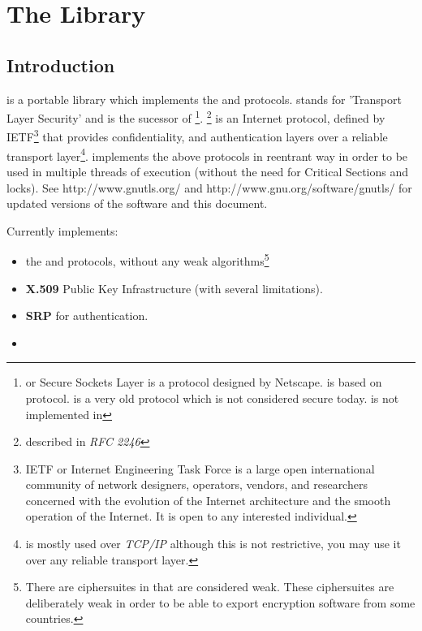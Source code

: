 \documentclass{book}
\begin{document}



\tableofcontents
\newpage
{}
\pagestyle{fancy}

\chapter{The Library}
\section{Introduction}
\par
\gnutls is a portable library which implements the \tlsI and 
\sslIII protocols.
\tls stands for 'Transport Layer Security' and is the sucessor of \ssl\footnote{
\ssl or Secure Sockets Layer is a protocol designed by Netscape. \tlsI is based on
\sslIII protocol. \sslII is a very old protocol which is 
not considered secure today. \sslII is not implemented in \gnutls}.
\tlsI\footnote{described in {\it RFC 2246}} is an Internet protocol,
defined by IETF\footnote{IETF or Internet Engineering Task Force 
is a large open international community of network
designers, operators, vendors, and researchers concerned with the evolution of 
the Internet architecture and the smooth operation of the Internet. It is open to any interested individual.}
that provides confidentiality, and authentication layers over a {reliable
transport layer}\footnote{\tls is mostly used over {\emph{TCP/IP}} although this is not restrictive, you may
use it over any reliable transport layer.}. \gnutls implements the
above protocols in reentrant way in order to be used in multiple threads of 
execution (without the need for Critical Sections and locks). See
http://www.gnutls.org/ and http://www.gnu.org/software/gnutls/ for
updated versions of the \gnutls software and this document.

\par
Currently \gnutls implements:
\begin{itemize}
 \item the \tlsI and \sslIII protocols, without any weak algorithms\footnote{
There are ciphersuites in \tlsI that are considered weak. These
ciphersuites are deliberately weak in order to be able to export encryption
software from some countries.}
 \item {\bf X.509} Public Key Infrastructure (with several limitations).
 \item {\bf SRP} for \tls authentication.
 \item {}
\end{itemize}
\end{document}

